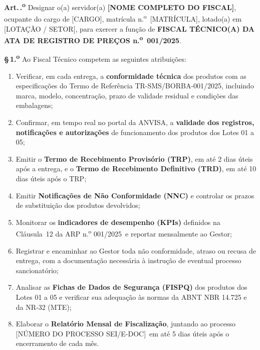 \documentclass[12pt,a4paper]{article}
\newcounter{artigo}
\newcommand{\artigo}[1]{%
  \stepcounter{artigo}%
  \medskip\noindent\textbf{Art.\,\theartigo.\textsuperscript{o}} #1}
\newcommand{\paragrafo}[2]{%
  \par\noindent\textbf{\S\,#1.\textsuperscript{o}} #2}
\newcommand{\exercicio}{2025}
\newcommand{\arpNum}{001}
\newcommand{\arpRef}{ARP n.\textsuperscript{o} 001/2025}
\newcommand{\trRef}{TR-SMS/BORBA-001/2025}
\newcommand{\procNum}{[NÚMERO DO PROCESSO SEI/E-DOC]}
\newcommand{\fiscalNome}{[NOME COMPLETO DO FISCAL]}
\newcommand{\fiscalCargo}{[CARGO]}
\newcommand{\fiscalMat}{[MATRÍCULA]}
\newcommand{\fiscalLotacao}{[LOTAÇÃO / SETOR]}
\begin{document}
\vspace{0.5cm}

\artigo{Designar o(a) servidor(a) \textbf{\fiscalNome}, ocupante do cargo de
\fiscalCargo, matrícula n.\textsuperscript{o}~\fiscalMat, lotado(a) em
\fiscalLotacao, para exercer a função de \textbf{FISCAL TÉCNICO(A) DA ATA DE
REGISTRO DE PREÇOS n.\textsuperscript{o}~\arpNum/\exercicio}.}

\paragrafo{1}{Ao Fiscal Técnico competem as seguintes atribuições:}

\begin{enumerate}[label=\Roman*.]
  \item Verificar, em cada entrega, a \textbf{conformidade técnica} dos produtos
    com as especificações do Termo de Referência \trRef, incluindo marca,
    modelo, concentração, prazo de validade residual e condições das embalagens;

  \item Confirmar, em tempo real no portal da ANVISA, a \textbf{validade dos
    registros, notificações e autorizações} de funcionamento dos produtos
    dos Lotes 01 a 05;

  \item Emitir o \textbf{Termo de Recebimento Provisório (TRP)}, em até 2 dias
    úteis após a entrega, e o \textbf{Termo de Recebimento Definitivo (TRD)},
    em até 10 dias úteis após o TRP;

  \item Emitir \textbf{Notificações de Não Conformidade (NNC)} e controlar os
    prazos de substituição dos produtos devolvidos;

  \item Monitorar os \textbf{indicadores de desempenho (KPIs)} definidos na
    Cláusula~12 da \arpRef\ e reportar mensalmente ao Gestor;

  \item Registrar e encaminhar ao Gestor toda não conformidade, atraso ou
    recusa de entrega, com a documentação necessária à instrução de eventual
    processo sancionatório;

  \item Analisar as \textbf{Fichas de Dados de Segurança (FISPQ)} dos produtos
    dos Lotes 01 a 05 e verificar sua adequação às normas da ABNT NBR 14.725
    e da NR-32 (MTE);

  \item Elaborar o \textbf{Relatório Mensal de Fiscalização}, juntando ao
    processo \procNum\ em até 5 dias úteis após o encerramento de cada mês.
\end{enumerate}
\end{document}
